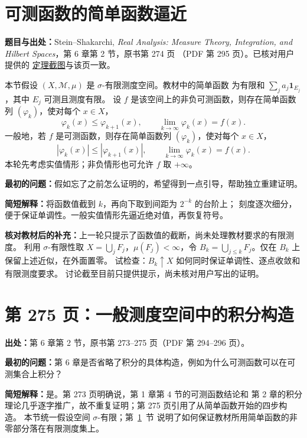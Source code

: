 \documentclass[UTF8,a4paper,11pt]{ctexart}
\begin{document}
\newpage
\section{可测函数的简单函数逼近}
\label{note:analysis-simple-function-approximation}
\textbf{题目与出处：}Stein--Shakarchi, \textit{Real Analysis: Measure Theory,
Integration, and Hilbert Spaces}，第 6 章第 2 节，原书第 274 页
（PDF 第 295 页）。已核对用户提供的
\href{\%E8\%AF\%BE\%E5\%A0\%82\%E8\%B5\%84\%E6\%96\%99/\%E7\%AE\%80\%E5\%8D\%95\%E5\%87\%BD\%E6\%95\%B0\%E9\%80\%BC\%E8\%BF\%91\%E5\%AE\%9A\%E7\%90\%86.png}{定理截图}与该页一致。

本节假设 $(X,\mathcal M,\mu)$ 是 $\sigma$-有限测度空间。教材中的简单函数
为有限和 $\sum_j a_j\mathbf1_{E_j}$，其中 $E_j$ 可测且测度有限。
设 $f$ 是该空间上的非负可测函数，则存在简单函数列 $(\varphi_k)$，使对每个 $x\in X$，
\[
\varphi_k(x)\leq\varphi_{k+1}(x),\qquad
\lim_{k\to\infty}\varphi_k(x)=f(x).
\]
一般地，若 $f$ 是可测函数，则存在简单函数列 $(\varphi_k)$，使对每个 $x\in X$，
\[
|\varphi_k(x)|\leq|\varphi_{k+1}(x)|,\qquad
\lim_{k\to\infty}\varphi_k(x)=f(x).
\]
本轮先考虑实值情形；非负情形也可允许 $f$ 取 $+\infty$。

\textbf{最初的问题：}假如忘了之前怎么证明的，希望得到一点引导，帮助独立重建证明。

\textbf{简短解释：}将函数值截到 $k$，再向下取到间距为 $2^{-k}$ 的台阶上；
刻度逐次细分，便于保证单调性。一般实值情形先逼近绝对值，再恢复符号。

\textbf{核对教材后的补充：}上一轮只提示了函数值的截断，尚未处理教材要求的有限测度。
利用 $\sigma$-有限性取 $X=\bigcup_j F_j$，$\mu(F_j)<\infty$，令
$B_k=\bigcup_{j\leq k}F_j$。仅在 $B_k$ 上保留上述近似，在外面置零。
试检查：$B_k\uparrow X$ 如何同时保证单调性、逐点收敛和有限测度要求。
讨论截至目前只提供提示，尚未核对用户写出的证明。

\section{第 275 页：一般测度空间中的积分构造}
\label{note:stein-ch6-p275-integral-construction}
\textbf{出处：}第 6 章第 2 节，原书第 273--275 页（PDF 第 294--296 页）。

\textbf{最初的问题：}第 6 章是否省略了积分的具体构造，例如为什么可测函数可以在可测集合上积分？

\textbf{简短解释：}是。第 273 页明确说，第 1 章第 4 节的可测函数结论和
第 2 章的积分理论几乎逐字推广，故不重复证明；第 275 页引用了从简单函数开始的四步构造。
本节统一假设空间 $\sigma$-有限；第~\ref{note:analysis-simple-function-approximation}~节
说明了如何保证教材所用简单函数的非零部分落在有限测度集上。
\end{document}
